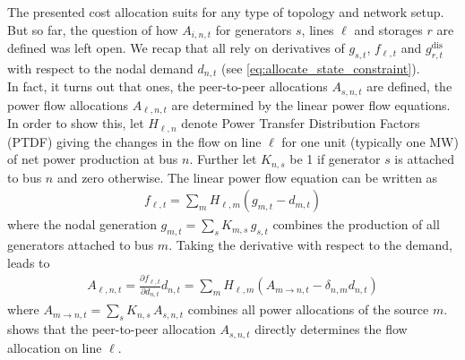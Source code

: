 \documentclass[11pt,twocolumn]{article}
\newcommand{\pdv}[2]{\frac{\partial #1}{\partial #2}}
\newcommand{\generation}{g_{s,t}}
\newcommand{\nodalgeneration}[1][n]{g_{#1,t}}
\newcommand{\flow}{f_{\ell,t}}
\newcommand{\storage}{g_{r,t}}
\newcommand{\storagedispatch}{\storage^\text{dis}}
\newcommand{\demand}[1][n]{d_{#1,t}}
\newcommand{\incidencegenerator}[1][n]{K_{#1,s}}
\newcommand{\ptdf}[1][n]{H_{\ell,#1}}
\newcommand{\allocatepeer}[1][s, n]{A_{#1,t}}
\newcommand{\allocateflow}[1][n]{A_{\ell,#1,t}}
\newcommand{\allocatestate}[1][i, n]{A_{#1,t}}
\begin{document}
The presented cost allocation suits for any type of topology and network setup. But so far, the question of how $\allocatestate$ for generators $s$, lines $\ell$ and storages $r$ are defined was left open. We recap that all rely on derivatives of $\generation$, $\flow$ and $\storagedispatch$  with respect to the nodal demand $\demand$ (see \cref{eq:allocate_state_constraint}). \\
% 
In fact, it turns out that ones, the peer-to-peer allocations $\allocatepeer$ are defined, the power flow allocations $\allocateflow$ are determined by the linear power flow equations.
In order to show this, let $\ptdf$ denote Power Transfer Distribution Factors (PTDF) giving the changes in the flow on line $\ell$ for one unit (typically one MW) of net power production at bus $n$.  Further let $\incidencegenerator$ be 1 if generator $s$ is attached to bus $n$ and zero otherwise. The linear power flow equation can be written as 
\begin{align}
 \flow  = \sum_m \ptdf[m] \left( \nodalgeneration[m] - \demand[m] \right)  
\end{align}
where the nodal generation $\nodalgeneration[m] = \sum_s \incidencegenerator[m] \, \generation $ combines the production of all generators attached to bus $m$. Taking the derivative with respect to the demand, leads to 
\begin{align}
 \allocateflow = \pdv{\flow}{\demand} \demand = \sum_m \ptdf[m] \left( \allocatepeer[m \rightarrow n]  - \delta_{n,m} \demand \right) 
 \label{eq:allocate_peer_to_allocate_flow}
\end{align}
where $\allocatepeer[m \rightarrow n] = \sum_s \incidencegenerator \, \allocatepeer$ combines all power allocations of the source $m$.  shows that the peer-to-peer allocation $\allocatepeer$ directly determines the flow allocation on line $\ell$.
\end{document}

